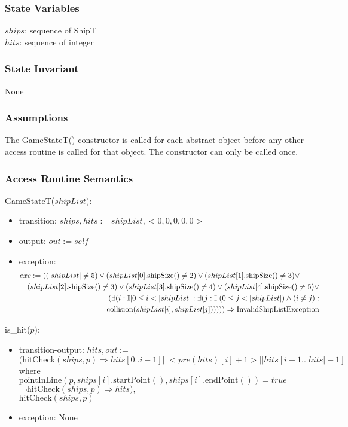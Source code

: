\documentclass[12pt]{article}
\newcommand\tab[1][0.5in]{\hspace*{#1}}
\begin{document}
\subsubsection* {State Variables}
$ships$: sequence of ShipT\\
$hits$: sequence of integer

\subsubsection* {State Invariant}
None

\subsubsection* {Assumptions}
The GameStateT() constructor is called for each abstract object before any other access routine is called for that
object.  The constructor can only be called once.

\subsubsection* {Access Routine Semantics}

\noindent GameStateT($shipList$):
\begin{itemize}
\item transition: $ships, hits := shipList, <0, 0, 0, 0, 0>$
\item output: $\mathit{out} := \mathit{self}$
\item exception: 
\begin{eqnarray*}
\lefteqn{exc := ((|shipList| \neq 5) \lor (shipList[0].\mbox{shipSize()} \neq 2)  \lor (shipList[1].\mbox{shipSize()} \neq 3)  \lor}\\
& &  (shipList[2].\mbox{shipSize()} \neq 3)  \lor (shipList[3].\mbox{shipSize()} \neq 4)  \lor (shipList[4].\mbox{shipSize()} \neq 5)  \lor\\
& &  (\exists( i : \mathbb{I} | 0 \leq i < |shipList| : \exists( j : \mathbb{I} | (0 \leq j < |shipList|) \land (i \neq j) :\\
& &  \mbox{collision}(shipList[i], shipList[j]))))) \Rightarrow \mathrm{InvalidShipListException}
\end{eqnarray*}
\end{itemize}

\noindent is\_hit($p$):
\begin{itemize}
\item transition-output: $hits, out := $\\\tab$(\mbox{hitCheck}(ships, p) \Rightarrow hits[0..i-1] ||\mathit{<}pre(hits)[i] + 1\mathit{>}|| hits[i + 1 .. |hits| -1 ]$ \\\tab\tab where $\mbox{pointInLine}(p, ships[i].\mbox{startPoint}(), ships[i].\mbox{endPoint}()) = true$\\\tab$|  \lnot \mbox{hitCheck}(ships, p) \Rightarrow hits),$\\$\mbox{hitCheck}(ships, p)$
\item exception: None
\end{itemize}
\end{document}

